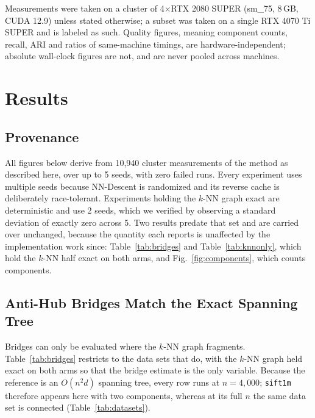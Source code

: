 \documentclass{ieeeaccess}
\begin{document}
Measurements were taken on a cluster of 4$\times$RTX 2080 SUPER (sm\_75, 8\,GB,
CUDA 12.9) unless stated otherwise; a subset was taken on a single RTX 4070 Ti
SUPER and is labeled as such. Quality figures, meaning component counts,
recall, ARI and ratios of same-machine timings, are hardware-independent;
absolute wall-clock figures are not, and are never pooled across machines.

\section{Results}
\label{sec:results}

\subsection{Provenance}
\label{sec:provenance}
All figures below derive from 10{,}940 cluster measurements of the method as
described here, over up to 5 seeds, with zero failed runs. Every experiment
uses multiple seeds because NN-Descent is randomized and its reverse cache is
deliberately race-tolerant. Experiments holding the $k$-NN graph exact are
deterministic and use 2 seeds, which we verified by observing a standard
deviation of exactly zero across 5. Two results predate that set and are
carried over unchanged, because the quantity each reports is unaffected by the
implementation work since: Table~\ref{tab:bridges} and
Table~\ref{tab:knnonly}, which hold the $k$-NN half exact on both arms, and
Fig.~\ref{fig:components}, which counts components.

\subsection{Anti-Hub Bridges Match the Exact Spanning Tree}
\label{sec:bridgeresults}

Bridges can only be evaluated where the $k$-NN graph fragments.
Table~\ref{tab:bridges} restricts to the data sets that do, with the $k$-NN
graph held exact on both arms so that the bridge estimate is the only variable.
Because the reference is an $O(n^2 d)$ spanning tree, every row runs at
$n = 4{,}000$; \texttt{sift1m} therefore appears here with two components,
whereas at its full $n$ the same data set is connected
(Table~\ref{tab:datasets}).
\end{document}
